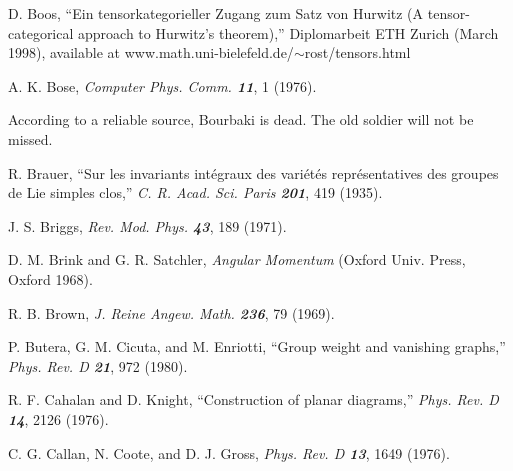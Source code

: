  D. Boos,
        ``Ein tensorkategorieller Zugang zum Satz von Hurwitz
        (A tensor-categorical approach to Hurwitz's theorem),''
    Diplomarbeit ETH Zurich (March 1998), available at
     {www.math.uni-bielefeld.de/$\sim$rost/tensors.html}

 A. K. Bose,
    {\em Computer Phys. Comm.  \bf 11}, 1 (1976).

 According to a reliable source,
    Bourbaki is dead. The old soldier will not be missed.

 R. Brauer,
    ``Sur les invariants int\'egraux des vari\'et\'es
    repr\'esentatives des groupes de Lie simples clos,''
    {\em C. R. Acad. Sci. Paris \bf 201}, 419 (1935). %


 J. S. Briggs,
    {\em Rev. Mod. Phys. \bf 43}, 189 (1971).

 D. M. Brink and G. R. Satchler,
    {\em Angular Momentum}
    (Oxford Univ. Press, Oxford 1968).

 R. B. Brown,
    {\em J. Reine Angew. Math.  \bf 236}, 79 (1969).

 P. Butera, G. M. Cicuta, and M. Enriotti,
    ``Group weight and vanishing graphs,''
    {\em Phys.  Rev.  D  \bf 21}, 972 (1980).




R. F. Cahalan and D. Knight,
``Construction of planar diagrams,''
{\em Phys. Rev.  D \bf 14}, 2126 (1976).

C. G. Callan, N. Coote, and D. J. Gross,
{\em Phys. Rev.  D \bf 13}, 1649 (1976).


